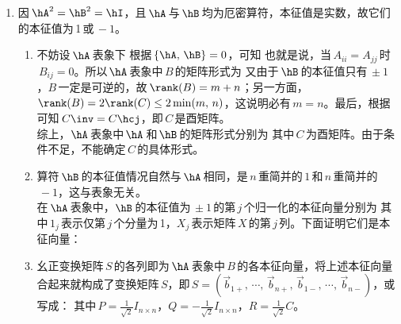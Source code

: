 \begin{enumerate}[label=2.\arabic*]
\item
因$\,\hA^2=\hB^2=\hI$，且$\,\hA\,$与$\,\hB\,$均为厄密算符，本征值是实数，故它们的本征值为\,1\,或$\,-1$。
\begin{enumerate}[label=(\arabic*)]
\item 
不妨设$\,\hA\,$表象下
根据$\,\{\hA,\,\hB\}=0$，可知
也就是说，当$\,A_{ii}=A_{jj}\,$时$\,B_{ij}=0$。所以$\,\hA\,$表象中$\,B\,$的矩阵形式为
又由于$\,\hB\,$的本征值只有$\,\pm1$，$B\,$一定是可逆的，故$\,\rank(B)=m+n$；另一方面，$\rank(B)=2\rank(C)\leq2\min(m,\,n)$，这说明必有$\,m=n$。最后，根据
可知$\,C\inv=C\hcj$，即$\,C\,$是酉矩阵。\\
综上，$\hA\,$表象中$\,\hA\,$和$\,\hB\,$的矩阵形式分别为
其中$\,C\,$为酉矩阵。由于条件不足，不能确定$\,C\,$的具体形式。
\setcounter{enumii}{2}
\item
算符$\,\hB\,$的本征值情况自然与$\,\hA\,$相同，是$\,n\,$重简并的$\,1\,$和$\,n\,$重简并的$\,-1$，这与表象无关。\\
在$\,\hA\,$表象中，$\hB\,$的本征值为$\,\pm1\,$的第$\,j\,$个归一化的本征向量分别为
其中$\,1_j\,$表示仅第$\,j\,$个分量为\,1，$X_j\,$表示矩阵$\,X\,$的第$\,j\,$列。下面证明它们是本征向量：
\setcounter{enumii}{4}
\item
幺正变换矩阵$\,S\,$的各列即为$\,\hA\,$表象中$\,B\,$的各本征向量，将上述本征向量合起来就构成了变换矩阵$\,S$，即$\,S=(\vec{b}_{1+},\,\cdots,\,\vec{b}_{n+},\,\vec{b}_{1-},\,\cdots,\,\vec{b}_{n-})$，或写成：
其中$\,P=\frac{1}{\sqrt{2}}I_{n\times n}$，$Q=-\frac{1}{\sqrt{2}}I_{n\times n}$，$R=\frac{1}{\sqrt{2}}C$。\\

\end{enumerate}
\end{enumerate}
